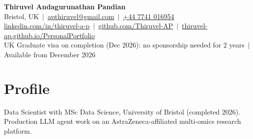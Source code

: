 \documentclass[a4paper,10pt]{article}
\begin{document}
\fontsize{10.5}{12.6}\selectfont

\begin{center}
  {\LARGE\bfseries Thiruvel Andagurunathan Pandian}\\[3pt]
  Bristol, UK \,$|$\, \href{mailto:apthiruvel@gmail.com}{apthiruvel@gmail.com} \,$|$\, \href{tel:+447741016954}{+44 7741 016954}\\[1pt]
\href{https://www.linkedin.com/in/thiruvel-a-p/}{linkedin.com/in/thiruvel-a-p} \,$|$\, \href{https://github.com/Thiruvel-AP}{github.com/Thiruvel-AP} \,$|$\, \href{https://thiruvel-ap.github.io/PersonalPortfolio/}{thiruvel-ap.github.io/PersonalPortfolio}\\[1pt]
  UK Graduate visa on completion (Dec 2026): no sponsorship needed for 2 years \,$|$\, Available from December 2026
\end{center}

\section{Profile}
Data Scientist with MSc Data Science, University of Bristol (completed 2026). Production LLM agent work on an AstraZeneca-affiliated multi-omics research platform.

\end{document}
